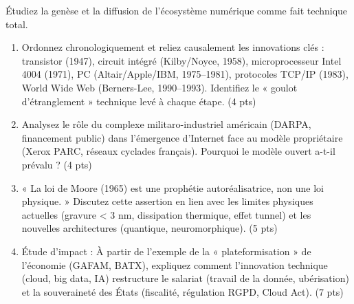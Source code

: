 \documentclass[11pt]{article}
\begin{document}
\begin{exercice}
Étudiez la genèse et la diffusion de l'écosystème numérique comme fait technique total.
\begin{enumerate}
    \item Ordonnez chronologiquement et reliez causalement les innovations clés : transistor (1947), circuit intégré (Kilby/Noyce, 1958), microprocesseur Intel 4004 (1971), PC (Altair/Apple/IBM, 1975--1981), protocoles TCP/IP (1983), World Wide Web (Berners-Lee, 1990--1993). Identifiez le « goulot d'étranglement » technique levé à chaque étape. \hfill (4 pts)
    \item Analysez le rôle du complexe militaro-industriel américain (DARPA, financement public) dans l'émergence d'Internet face au modèle propriétaire (Xerox PARC, réseaux cyclades français). Pourquoi le modèle ouvert a-t-il prévalu ? \hfill (4 pts)
    \item « La loi de Moore (1965) est une prophétie autoréalisatrice, non une loi physique. » Discutez cette assertion en lien avec les limites physiques actuelles (gravure < 3 nm, dissipation thermique, effet tunnel) et les nouvelles architectures (quantique, neuromorphique). \hfill (5 pts)
    \item Étude d'impact : À partir de l'exemple de la « plateformisation » de l'économie (GAFAM, BATX), expliquez comment l'innovation technique (cloud, big data, IA) restructure le salariat (travail de la donnée, ubérisation) et la souveraineté des États (fiscalité, régulation RGPD, Cloud Act). \hfill (7 pts)
\end{enumerate}
\end{exercice}
\end{document}
